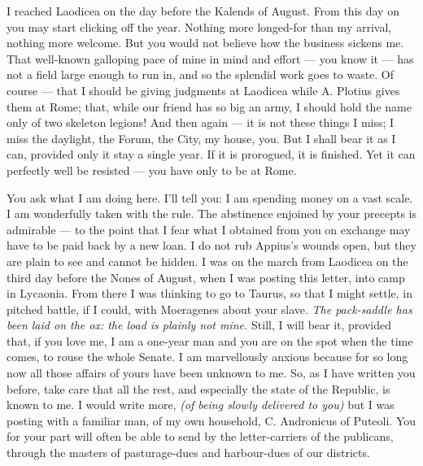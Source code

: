 

 I reached Laodicea on the day before the Kalends of August. From this day on you may start clicking off the year. Nothing more longed-for than my arrival, nothing more welcome. But you would not believe how the business sickens me. That well-known galloping pace of mine in mind and effort --- you know it --- has not a field large enough to run in, and so the splendid work goes to waste. Of course --- that I should be giving judgments at Laodicea while A. Plotius gives them at Rome; that, while our friend has so big an army, I should hold the name only of two skeleton legions! And then again --- it is not these things I miss; I miss the daylight, the Forum, the City, my house, you. But I shall bear it as I can, provided only it stay a single year. If it is prorogued, it is finished. Yet it can perfectly well be resisted --- you have only to be at Rome.

 You ask what I am doing here. I'll tell you: I am spending money on a vast scale. I am wonderfully taken with the rule. The abstinence enjoined by your precepts is admirable --- to the point that I fear what I obtained from you on exchange may have to be paid back by a new loan. I do not rub Appius's wounds open, but they are plain to see and cannot be hidden. I was on the march from Laodicea on the third day before the Nones of August, when I was posting this letter, into camp in Lycaonia. From there I was thinking to go to Taurus, so that I might settle, in pitched battle, if I could, with Moeragenes about your slave. \textit{The pack-saddle has been laid on the ox: the load is plainly not mine.} Still, I will bear it, provided that, if you love me, I am a one-year man and you are on the spot when the time comes, to rouse the whole Senate. I am marvellously anxious because for so long now all those affairs of yours have been unknown to me. So, as I have written you before, take care that all the rest, and especially the state of the Republic, is known to me. I would write more, \textit{(of being slowly delivered to you)} but I was posting with a familiar man, of my own household, C. Andronicus of Puteoli. You for your part will often be able to send by the letter-carriers of the publicans, through the masters of pasturage-dues and harbour-dues of our districts.

